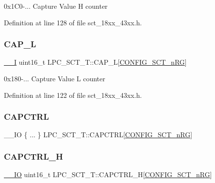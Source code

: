 0x1\+C0-\/... Capture Value H counter 

Definition at line 128 of file sct\+\_\+18xx\+\_\+43xx.\+h.

\mbox{\label{struct_l_p_c___s_c_t___t_a2fa99744e0810b96bbe3b0d6732b3f88}} 
\subsubsection{\texorpdfstring{C\+A\+P\+\_\+L}{CAP\_L}}
{\footnotesize\ttfamily \hyperlink{core__sc300_8h_af63697ed9952cc71e1225efe205f6cd3}{\+\_\+\+\_\+I} uint16\+\_\+t L\+P\+C\+\_\+\+S\+C\+T\+\_\+\+T\+::\+C\+A\+P\+\_\+L\mbox{[}\hyperlink{group___s_c_t__18_x_x__43_x_x_ga8d80e251208a01483a6b00c81ecb7493}{C\+O\+N\+F\+I\+G\+\_\+\+S\+C\+T\+\_\+n\+RG}\mbox{]}}

0x180-\/... Capture Value L counter 

Definition at line 122 of file sct\+\_\+18xx\+\_\+43xx.\+h.

\mbox{\label{struct_l_p_c___s_c_t___t_aaa6f62e50b846cadd0bcbc8364836369}} 
\subsubsection{\texorpdfstring{C\+A\+P\+C\+T\+RL}{CAPCTRL}}
{\footnotesize\ttfamily \+\_\+\+\_\+\+IO \{ ... \}   L\+P\+C\+\_\+\+S\+C\+T\+\_\+\+T\+::\+C\+A\+P\+C\+T\+RL\mbox{[}\hyperlink{group___s_c_t__18_x_x__43_x_x_ga8d80e251208a01483a6b00c81ecb7493}{C\+O\+N\+F\+I\+G\+\_\+\+S\+C\+T\+\_\+n\+RG}\mbox{]}}

\mbox{\label{struct_l_p_c___s_c_t___t_afcf9a05939cf2ef2f6b1e56ca401498d}} 
\subsubsection{\texorpdfstring{C\+A\+P\+C\+T\+R\+L\+\_\+H}{CAPCTRL\_H}}
{\footnotesize\ttfamily \hyperlink{core__sc300_8h_aec43007d9998a0a0e01faede4133d6be}{\+\_\+\+\_\+\+IO} uint16\+\_\+t L\+P\+C\+\_\+\+S\+C\+T\+\_\+\+T\+::\+C\+A\+P\+C\+T\+R\+L\+\_\+H\mbox{[}\hyperlink{group___s_c_t__18_x_x__43_x_x_ga8d80e251208a01483a6b00c81ecb7493}{C\+O\+N\+F\+I\+G\+\_\+\+S\+C\+T\+\_\+n\+RG}\mbox{]}}

